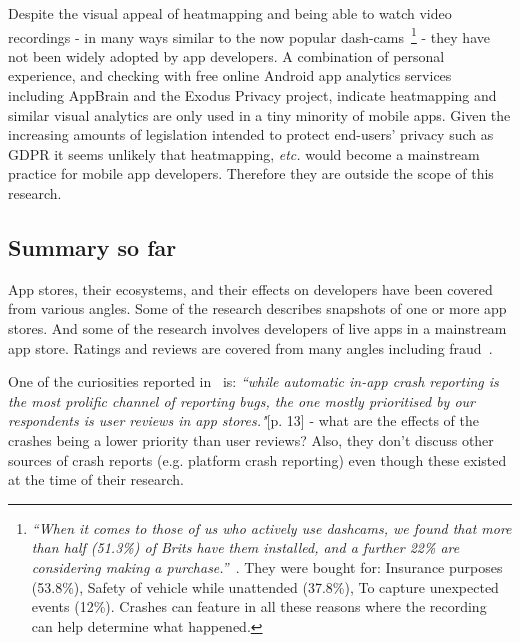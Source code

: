 Despite the visual appeal of heatmapping and being able to watch video recordings - in many ways similar to the now popular dash-cams~\footnote{\emph{``When it comes to those of us who actively use dashcams, we found that more than half (51.3\%) of Brits have them installed, and a further 22\% are considering making a purchase.''}~\citet{vardy2018_a_survey_of_dashcams_in_uk_cars}. They were bought for: Insurance purposes (53.8\%), Safety of vehicle while unattended (37.8\%), To capture unexpected events (12\%). Crashes can feature in all these reasons where the recording can help determine what happened.} - they have not been widely adopted by app developers. A combination of personal experience, and checking with free online Android app analytics services including AppBrain and the Exodus Privacy project, indicate heatmapping and similar visual analytics are only used in a tiny minority of mobile apps. Given the increasing amounts of legislation intended to protect end-users' privacy such as GDPR it seems unlikely that heatmapping, \textit{etc.} would become a mainstream practice for mobile app developers. Therefore they are outside the scope of this research.




\subsection{Summary so far} %
App stores, their ecosystems, and their effects on developers have been covered from various angles. Some of the research describes snapshots of one or more app stores. And some of the research involves developers of live apps in a mainstream app store. Ratings and reviews are covered from many angles including fraud~\citep{xie2015_appwatcher_unveiling_the_underground_market_of_trading_mobile_app_reviews}. 

One of the curiosities reported in~\citet{alsubaihin2019app_store_effects_on_software_engineering} is: \emph{``while automatic in-app crash reporting is the most prolific channel of reporting bugs, the one mostly prioritised by our respondents is user reviews in app stores."}[p. 13] - what are the effects of the crashes being a lower priority than user reviews? Also, they don't discuss other sources of crash reports (e.g. platform crash reporting) even though these existed at the time of their research.

